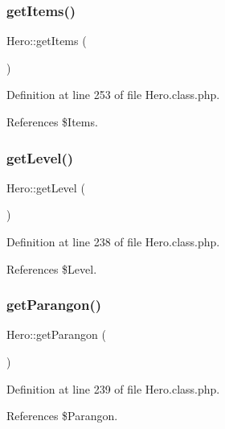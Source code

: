 \subsubsection{\texorpdfstring{get\+Items()}{getItems()}}
{\footnotesize\ttfamily Hero\+::get\+Items (\begin{DoxyParamCaption}{ }\end{DoxyParamCaption})}



Definition at line 253 of file Hero.\+class.\+php.



References \$\+Items.

\mbox{\label{class_hero_ac2c4274358ea9c0d0909e7e95bf7a1c2}} 
\subsubsection{\texorpdfstring{get\+Level()}{getLevel()}}
{\footnotesize\ttfamily Hero\+::get\+Level (\begin{DoxyParamCaption}{ }\end{DoxyParamCaption})}



Definition at line 238 of file Hero.\+class.\+php.



References \$\+Level.

\mbox{\label{class_hero_a6724c7043a69e5abb19c8f42df5bd4a1}} 
\subsubsection{\texorpdfstring{get\+Parangon()}{getParangon()}}
{\footnotesize\ttfamily Hero\+::get\+Parangon (\begin{DoxyParamCaption}{ }\end{DoxyParamCaption})}



Definition at line 239 of file Hero.\+class.\+php.



References \$\+Parangon.

\mbox{\label{class_hero_a4d4e2d1cbefca5ae1445a495cbba43c2}} 
